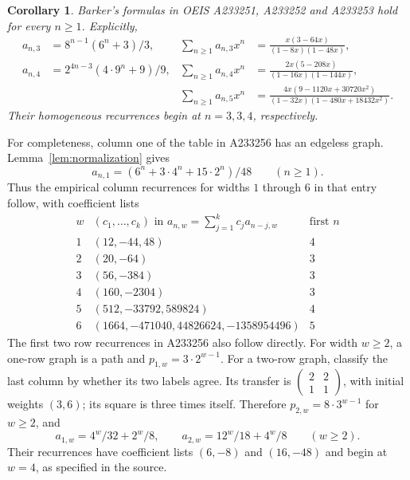 \documentclass[11pt]{article}
\newtheorem{corollary}[theorem]{Corollary}
\begin{document}
\begin{corollary}
Barker's formulas in OEIS A233251, A233252 and A233253
\cite{three,four,five} hold for every $n\ge1$. Explicitly,
\begin{align*}
a_{n,3}&=8^{n-1}(6^n+3)/3,&
\sum_{n\ge1}a_{n,3}x^n&=\frac{x(3-64x)}{(1-8x)(1-48x)},\\
a_{n,4}&=2^{4n-3}(4\cdot9^n+9)/9,&
\sum_{n\ge1}a_{n,4}x^n&=\frac{2x(5-208x)}{(1-16x)(1-144x)},\\
&&\sum_{n\ge1}a_{n,5}x^n&=
\frac{4x(9-1120x+30720x^2)}{(1-32x)(1-480x+18432x^2)}.
\end{align*}
Their homogeneous recurrences begin at $n=3,3,4$, respectively.
\end{corollary}

For completeness, column one of the table in A233256 \cite{table}
has an edgeless graph. Lemma~\ref{lem:normalization} gives
\[
a_{n,1}=(6^n+3\cdot4^n+15\cdot2^n)/48\qquad(n\ge1).
\]
Thus the empirical column recurrences for widths $1$ through $6$ in
that entry follow, with coefficient lists
\[
\begin{array}{c|l|c}
w& (c_1,\ldots,c_k)\text{ in }a_{n,w}=\sum_{j=1}^k c_ja_{n-j,w}
&\text{first }n\\\hline
1&(12,-44,48)&4\\
2&(20,-64)&3\\
3&(56,-384)&3\\
4&(160,-2304)&3\\
5&(512,-33792,589824)&4\\
6&(1664,-471040,44826624,-1358954496)&5
\end{array}
\]
The first two row recurrences in A233256 also follow directly. For
width $w\ge2$, a one-row graph is a path and
$p_{1,w}=3\cdot2^{w-1}$. For a two-row graph, classify the last column
by whether its two labels agree. Its transfer is
$\left(\begin{smallmatrix}2&2\\1&1\end{smallmatrix}\right)$,
with initial weights $(3,6)$; its square is three times itself.
Therefore $p_{2,w}=8\cdot3^{w-1}$ for $w\ge2$, and
\[
a_{1,w}=4^w/32+2^w/8,\qquad
a_{2,w}=12^w/18+4^w/8\qquad(w\ge2).
\]
Their recurrences have coefficient lists $(6,-8)$ and $(16,-48)$ and
begin at $w=4$, as specified in the source.
\end{document}
